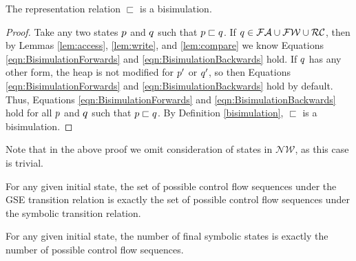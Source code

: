 \begin{theorem}
\label{th:bisim}
The representation relation $\sqsubset$ is a bisimulation.
\end{theorem}

\begin{proof}
Take any two states $p$ and $q$ such that $p \sqsubset q$. If $q \in \mathcal{FA} \cup \mathcal{FW} \cup \mathcal{RC}$, then by Lemmas \ref{lem:access}, \ref{lem:write}, and \ref{lem:compare} we know Equations \ref{eqn:BisimulationForwards} and \ref{eqn:BisimulationBackwards} hold. If $q$ has any other form, the heap is not modified for $p^\prime$ or $q^\prime$, so then Equations \ref{eqn:BisimulationForwards} and \ref{eqn:BisimulationBackwards} hold by default. Thus, Equations \ref{eqn:BisimulationForwards} and \ref{eqn:BisimulationBackwards} hold for all  $p$ and $q$ such that $p \sqsubset q$. By Definition \ref{bisimulation}, $\sqsubset$ is a bisimulation.
\end{proof}

Note that in the above proof we omit consideration of states in $\mathcal{NW}$, as this case is trivial.

\begin{corollary}
For any given initial state, the set of possible control flow sequences under the GSE transition relation is exactly the set of possible control flow sequences under the symbolic transition relation.
\end{corollary}

\begin{corollary}
For any given initial state, the number of final symbolic states is exactly the number of possible control flow sequences.
\end{corollary}
